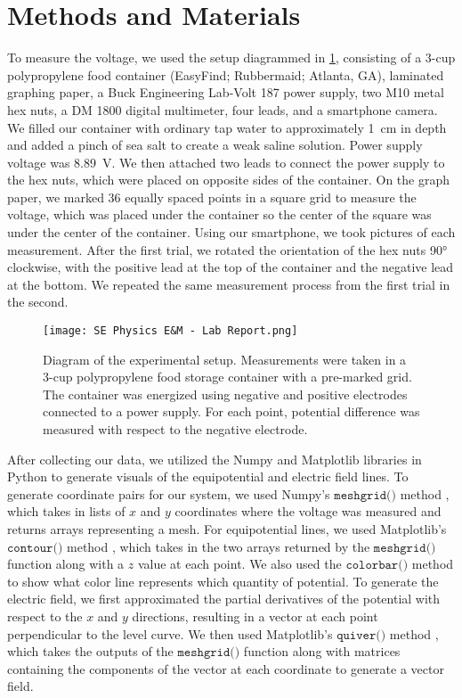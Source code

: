\documentclass[10pt,journal,twoside]{IEEEtran}
\begin{document}
\section{Methods and Materials}
To measure the voltage, we used the setup diagrammed in \cref{fig:1}, consisting of a 3-cup polypropylene food container (EasyFind; Rubbermaid; Atlanta, GA), laminated graphing paper, a Buck Engineering Lab-Volt 187 power supply, two M10 metal hex nuts, a DM 1800 digital multimeter, four leads, and a smartphone camera. We filled our container with ordinary tap water to approximately \qty{1}{\centi\meter} in depth and added a pinch of sea salt to create a weak saline solution. Power supply voltage was \qty{8.89}{\volt}. We then attached two leads to connect the power supply to the hex nuts, which were placed on opposite sides of the container. On the graph paper, we marked 36 equally spaced points in a  square grid to measure the voltage, which was placed under the container so the center of the square was under the center of the container. Using our smartphone, we took pictures of each measurement. After the first trial, we rotated the orientation of the hex nuts \ang{90} clockwise, with the positive lead at the top of the container and the negative lead at the bottom. We repeated the same measurement process from the first trial in the second.
\begin{figure}
\begin{center}
\texttt{[image: SE Physics E\&M - Lab Report.png]}
\end{center}
\caption{Diagram of the experimental setup. Measurements were taken in a 3-cup polypropylene food storage container with a pre-marked  grid. The container was energized using negative and positive electrodes connected to a power supply. For each point, potential difference was measured with respect to the negative electrode.}
\label{fig:1}
\end{figure}

After collecting our data, we utilized the Numpy \cite{harris2020array} and Matplotlib \cite{hunter:2007} libraries in Python to generate visuals of the equipotential and electric field lines. To generate coordinate pairs for our system, we used Numpy’s $\texttt{meshgrid()}$ method \cite{hunter:2007}, which takes in lists of $x$ and $y$ coordinates where the voltage was measured and returns arrays representing a mesh. For equipotential lines, we used Matplotlib’s $\texttt{contour()}$ method \cite{hunter:2007}, which takes in the two arrays returned by the $\texttt{meshgrid()}$  function along with a $z$ value at each point. We also used the $\texttt{colorbar()}$ method to show what color line represents which quantity of potential. To generate the electric field, we first approximated the partial derivatives of the potential with respect to the $x$ and $y$ directions, resulting in a vector at each point perpendicular to the level curve. We then used Matplotlib’s $\texttt{quiver()}$ method \cite{hunter:2007}, which takes the outputs of the $\texttt{meshgrid()}$  function along with matrices containing the components of the vector at each coordinate to generate a vector field. 
\end{document}
